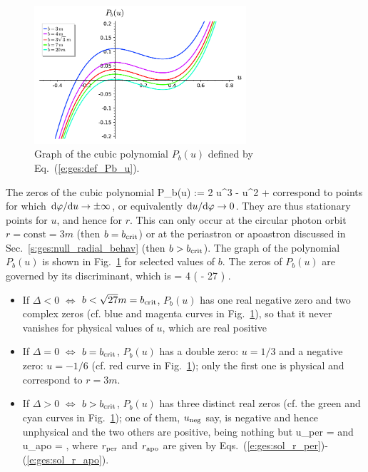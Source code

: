 \begin{figure}
\centerline{\includegraphics[width=0.7\textwidth]{ges_polynomial_b_u.pdf}}
\caption[]{\label{f:gis:polynomial_b_u} \footnotesize
Graph of the cubic polynomial $P_b(u)$ defined by Eq.~(\ref{e:ges:def_Pb_u}).}
\end{figure}

The zeros of the cubic polynomial
\be \label{e:ges:def_Pb_u}
        P_b(u) := 2 u^3 - u^2 + 
\ee
correspond to points for which $\mathrm{d}\varphi/\mathrm{d} u \to \pm \infty$,
or equivalently $\mathrm{d} u /\mathrm{d}\varphi \to 0$. They are thus stationary points
for $u$, and hence for $r$. This can only occur at the circular photon
orbit $r = \mathrm{const} = 3 m$ (then $b=b_{\rm crit}$)
or at the periastron or apoastron discussed
in Sec.~\ref{s:ges:null_radial_behav} (then $b > b_{\rm crit}$).
The graph of the polynomial $P_b(u)$ is shown in Fig.~\ref{f:gis:polynomial_b_u}
for selected values of $b$.
The zeros of $P_b(u)$ are governed by its
discriminant, which is
\be
    \Delta = 4  \left(  - 27 \right) .
\ee
\begin{itemize}
\item If $\Delta<0$ $\iff$ $b <\sqrt{27} m = b_{\rm crit}$,
$P_b(u)$ has one real negative zero and two complex zeros
(cf. blue and magenta curves in Fig.~\ref{f:gis:polynomial_b_u}),
so that it never vanishes
for physical values of $u$, which are real positive
\item If $\Delta=0$ $\iff$ $b = b_{\rm crit}$, $P_b(u)$
has a double zero: $u=1/3$ and a negative zero: $u=-1/6$ (cf. red curve
in Fig.~\ref{f:gis:polynomial_b_u}); only the first
one is physical and correspond to $r=3m$.
\item If $\Delta>0$ $\iff$ $b > b_{\rm crit}$, $P_b(u)$ has three distinct
real zeros (cf. the green and cyan curves
in Fig.~\ref{f:gis:polynomial_b_u}); one of them, $u_{\rm neg}$ say, is
negative and hence unphysical and the two others are positive, being nothing but
\be \label{e:ges:def_u_per_apo}
    u_{\rm per} =  \qquad\mbox{and}\qquad
    u_{\rm apo} =  ,
\ee
where $r_{\rm per}$ and $r_{\rm apo}$ are given by
Eqs.~(\ref{e:ges:sol_r_per})-(\ref{e:ges:sol_r_apo}).
\end{itemize}


